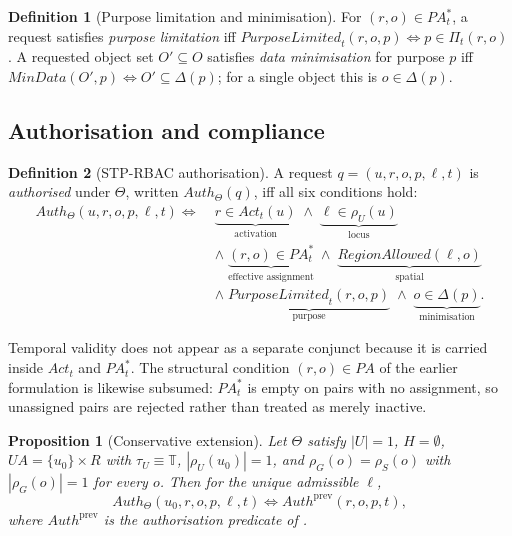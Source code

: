 \documentclass[11pt]{article}
\theoremstyle{definition}
\newtheorem{definition}{Definition}
\theoremstyle{plain}
\newtheorem{proposition}[theorem]{Proposition}
\theoremstyle{remark}
\newcommand{\Auth}{\mathit{Auth}}
\newcommand{\RegionOK}{\mathit{RegionAllowed}}
\newcommand{\PurpOK}{\mathit{PurposeLimited}}
\newcommand{\MinData}{\mathit{MinData}}
\newcommand{\Act}{\mathit{Act}}
\newcommand{\Tdom}{\mathbb{T}}
\begin{document}
\begin{definition}[Purpose limitation and minimisation]
For $(r,o) \in PA^{*}_t$, a request satisfies \emph{purpose limitation} iff
$\PurpOK_t(r,o,p) \iff p \in \Pi_t(r,o)$. A requested object set
$O' \subseteq O$ satisfies \emph{data minimisation} for purpose $p$ iff
$\MinData(O',p) \iff O' \subseteq \Delta(p)$; for a single object this is
$o \in \Delta(p)$.
\end{definition}

\subsection{Authorisation and compliance}

\begin{definition}[STP-RBAC authorisation]
\label{def:auth}
A request $q = (u,r,o,p,\ell,t)$ is \emph{authorised} under $\Theta$, written
$\Auth_\Theta(q)$, iff all six conditions hold:
\[
\begin{aligned}
  \Auth_\Theta(u,r,o,p,\ell,t) \iff\;
  & \underbrace{r \in \Act_t(u)}_{\text{activation}}
  \;\land\;
    \underbrace{\ell \in \rho_U(u)}_{\text{locus}} \\[4pt]
  &\land\;
    \underbrace{(r,o) \in PA^{*}_t}_{\text{effective assignment}}
  \;\land\;
    \underbrace{\RegionOK(\ell,o)}_{\text{spatial}} \\[4pt]
  &\land\;
    \underbrace{\PurpOK_t(r,o,p)}_{\text{purpose}}
  \;\land\;
    \underbrace{o \in \Delta(p)}_{\text{minimisation}} .
\end{aligned}
\]
\end{definition}

Temporal validity does not appear as a separate conjunct because it is carried
inside $\Act_t$ and $PA^{*}_t$. The structural condition $(r,o) \in PA$ of the
earlier formulation is likewise subsumed: $PA^{*}_t$ is empty on pairs with no
assignment, so unassigned pairs are rejected rather than treated as merely
inactive.

\begin{proposition}[Conservative extension]
\label{prop:conservative}
Let $\Theta$ satisfy $|U| = 1$, $H = \emptyset$, $UA = \{u_0\} \times R$ with
$\tau_U \equiv \Tdom$, $|\rho_U(u_0)| = 1$, and
$\rho_G(o) = \rho_S(o)$ with $|\rho_G(o)| = 1$ for every $o$. Then for the
unique admissible $\ell$,
\[
  \Auth_\Theta(u_0, r, o, p, \ell, t)
  \iff
  \Auth^{\mathrm{prev}}(r,o,p,t),
\]
where $\Auth^{\mathrm{prev}}$ is the authorisation predicate of
\citet{kokash2026compliance}.
\end{proposition}
\end{document}
